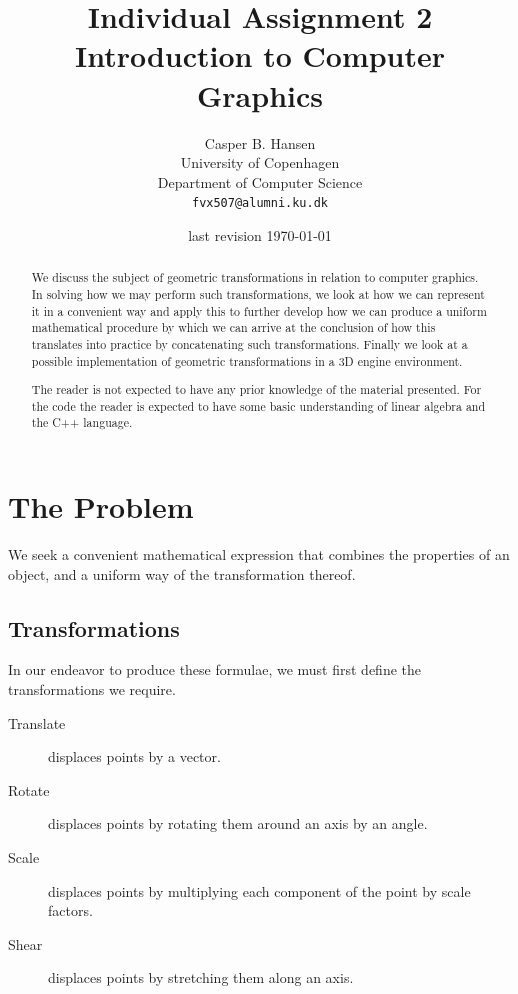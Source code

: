 \documentclass[11pt]{article}
\title
{
    {\Large Individual Assignment 2} \\
    Introduction to Computer Graphics
}
\author
{
    Casper B. Hansen \\
    University of Copenhagen \\
    Department of Computer Science \\
    {\tt fvx507@alumni.ku.dk}
}
\date{last revision \today}
\begin{document}
\clearpage\maketitle\vspace{1in}
\begin{multicols}{2}
    \begin{abstract}
        We discuss the subject of geometric transformations in relation to
        computer graphics. In solving how we may perform such transformations,
        we look at how we can represent it in a convenient way and apply this
        to further develop how we can produce a uniform mathematical procedure
        by which we can arrive at the conclusion of how this translates into
        practice by concatenating such transformations. Finally we look at a
        possible implementation of geometric transformations in a 3D
        engine environment.
        
        The reader is not expected to have any prior knowledge of the material
        presented. For the code the reader is expected to have some basic
        understanding of linear algebra  and the C++ language.
    \end{abstract}
    \vfill\columnbreak\tableofcontents\vfill
\end{multicols}
\thispagestyle{empty}\newpage

\section{The Problem}
We seek a convenient mathematical expression that combines the properties of
an object, and a uniform way of the transformation thereof.

\subsection{Transformations}
In our endeavor to produce these formulae, we must first define the
transformations we require.
\begin{description}
    \item[Translate] displaces points by a vector.
    \item[Rotate] displaces points by rotating them around an axis by an
    angle.
    \item[Scale] displaces points by multiplying each component of the point
    by scale factors.
    \item[Shear] displaces points by stretching them along an axis.
\end{description}
\end{document}
